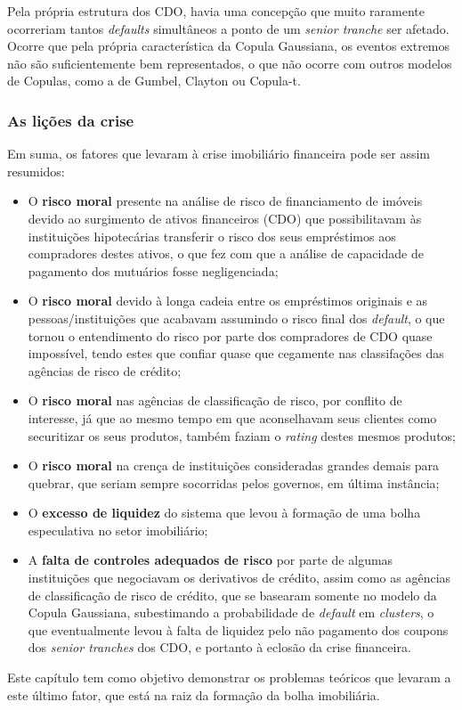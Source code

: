 \documentclass[
	12pt,				%
	oneside,			%
	a4paper,			%
	chapter=TITLE,		%
	section=TITLE,		%
	english,			%
	brazil				%
	]{abntex2}
\begin{document}
\begin{refsection}
Pela própria estrutura dos \gls{CDO}, havia uma concepção que muito raramente
ocorreriam tantos \emph{defaults} simultâneos a ponto de um \emph{senior tranche} ser
afetado. Ocorre que pela própria característica da Copula Gaussiana, os eventos
extremos não são suficientemente bem representados, o que não ocorre com outros
modelos de Copulas, como a de Gumbel, Clayton ou Copula-t.

\hypertarget{as-liuxe7uxf5es-da-crise}{%
\subsubsection{As lições da crise}\label{as-liuxe7uxf5es-da-crise}}

Em suma, os fatores que levaram à crise imobiliário financeira pode ser assim
resumidos:
\begin{itemize}
\item
  O \textbf{risco moral} presente na análise de risco de financiamento de imóveis
  devido ao surgimento de ativos financeiros (\gls{CDO}) que possibilitavam às
  instituições hipotecárias transferir o risco dos seus empréstimos aos
  compradores destes ativos, o que fez com que a análise de capacidade de
  pagamento dos mutuários fosse negligenciada;
\item
  O \textbf{risco moral} devido à longa cadeia entre os empréstimos originais e as
  pessoas/instituições que acabavam assumindo o risco final dos \emph{default}, o que
  tornou o entendimento do risco por parte dos compradores de \gls{CDO} quase
  impossível, tendo estes que confiar quase que cegamente nas classifações das
  agências de risco de crédito;
\item
  O \textbf{risco moral} nas agências de classificação de risco, por conflito de
  interesse, já que ao mesmo tempo em que aconselhavam seus clientes como
  securitizar os seus produtos, também faziam o \emph{rating} destes mesmos produtos;
\item
  O \textbf{risco moral} na crença de instituições consideradas grandes demais para
  quebrar, que seriam sempre socorridas pelos governos, em última instância;
\item
  O \textbf{excesso de liquidez} do sistema que levou à formação de uma bolha
  especulativa no setor imobiliário;
\item
  A \textbf{falta de controles adequados de risco} por parte de algumas instituições
  que negociavam os derivativos de crédito, assim como as agências de
  classificação de risco de crédito, que se basearam somente no modelo da Copula
  Gaussiana, subestimando a probabilidade de \emph{default} em \emph{clusters}, o que
  eventualmente levou à falta de liquidez pelo não pagamento dos coupons dos
  \emph{senior tranches} dos \gls{CDO}, e portanto à eclosão da crise financeira.
\end{itemize}
Este capítulo tem como objetivo demonstrar os problemas teóricos que levaram
a este último fator, que está na raiz da formação da bolha imobiliária.


\end{refsection}
\end{document}
